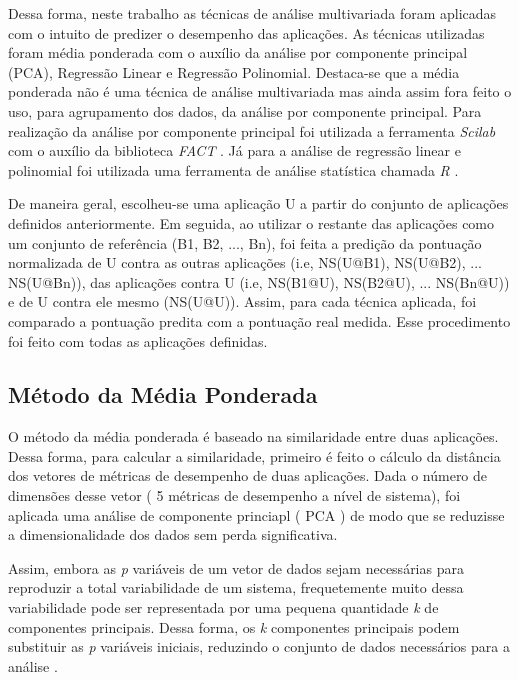 Dessa forma, neste trabalho as técnicas de análise multivariada foram aplicadas com o intuito de predizer o desempenho das aplicações. As técnicas utilizadas foram média ponderada com o auxílio da análise por componente principal (PCA), Regressão Linear e Regressão Polinomial. Destaca-se que a média ponderada não é uma técnica de análise multivariada mas ainda assim fora feito o uso, para agrupamento dos dados, da análise por componente principal. Para realização da análise por componente principal foi utilizada a ferramenta \textit{Scilab} \footnotemark[15] com o auxílio da biblioteca \textit{FACT} \footnotemark[16]. Já para a análise de regressão linear e polinomial foi utilizada uma ferramenta de análise statística chamada \textit{R} \footnotemark[17].



De maneira geral, escolheu-se uma aplicação U a partir do conjunto de aplicações definidos anteriormente. Em seguida, ao utilizar o restante das aplicações como um conjunto de referência (B1, B2, ..., Bn), foi feita a predição da pontuação normalizada de U contra as outras aplicações (i.e, NS(U@B1), NS(U@B2), ... NS(U@Bn)), das aplicações contra U (i.e, NS(B1@U),
NS(B2@U), ... NS(Bn@U)) e de U contra ele mesmo (NS(U@U)). Assim, para cada técnica aplicada, foi comparado a pontuação predita com a pontuação real medida. Esse procedimento foi feito com todas as aplicações definidas.
\subsection{Método da Média Ponderada}
O método da média ponderada é baseado na similaridade entre duas aplicações. Dessa forma, para calcular a similaridade, primeiro é feito o cálculo da distância dos vetores de métricas de desempenho de duas aplicações. Dada o número de dimensões desse vetor ( 5 métricas de desempenho a nível de sistema), foi aplicada uma análise de componente princiapl ( PCA ) de modo que se reduzisse a dimensionalidade dos dados sem perda significativa.

Assim, embora as \textit{p} variáveis de um vetor de dados sejam necessárias para reproduzir a total variabilidade de um sistema, frequetemente muito dessa variabilidade pode ser representada por uma pequena quantidade \textit{k} de componentes principais. Dessa forma, os \textit{k} componentes principais podem substituir  as \textit{p} variáveis iniciais, reduzindo o conjunto de dados necessários para a análise \cite{johnson1988}.

